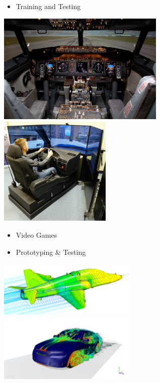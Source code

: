 \documentclass[
  14pt,
  english,
  a4paper,
]{scrreprt}
\providecommand{\tightlist}{%
  \setlength{\itemsep}{0pt}\setlength{\parskip}{0pt}}
\begin{document}
\begin{itemize}
\tightlist
\item
  Training and Testing
\end{itemize}

\includegraphics[width=0.6\textwidth,height=\textheight]{figures/Flight-sim.jpg}
\includegraphics[width=0.4\textwidth,height=\textheight]{figures/Driving-sim.png}

\begin{itemize}
\tightlist
\item
  Video Games
\item
  Prototyping \& Testing
\end{itemize}

\includegraphics[width=0.5\textwidth,height=\textheight]{figures/Airplanesim.png}
\includegraphics[width=0.5\textwidth,height=\textheight]{figures/Carsim.png}
\end{document}
